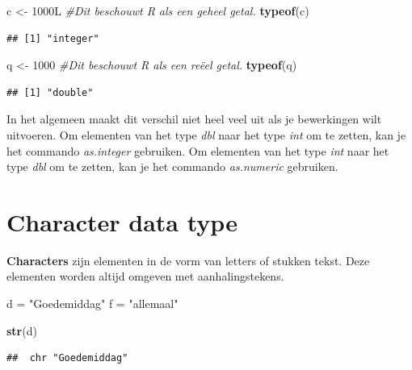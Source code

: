 \documentclass[
]{book}
\newenvironment{Shaded}{\begin{snugshade}}{\end{snugshade}}
\newcommand{\CommentTok}[1]{\textcolor[rgb]{0.56,0.35,0.01}{\textit{#1}}}
\newcommand{\DecValTok}[1]{\textcolor[rgb]{0.00,0.00,0.81}{#1}}
\newcommand{\FunctionTok}[1]{\textcolor[rgb]{0.13,0.29,0.53}{\textbf{#1}}}
\newcommand{\NormalTok}[1]{#1}
\newcommand{\OtherTok}[1]{\textcolor[rgb]{0.56,0.35,0.01}{#1}}
\newcommand{\StringTok}[1]{\textcolor[rgb]{0.31,0.60,0.02}{#1}}
\begin{document}
\begin{Shaded}
\begin{Highlighting}[]
\NormalTok{c }\OtherTok{\textless{}{-}}\NormalTok{ 1000L }\CommentTok{\#Dit beschouwt R als een geheel getal.}
\FunctionTok{typeof}\NormalTok{(c)}
\end{Highlighting}
\end{Shaded}

\begin{verbatim}
## [1] "integer"
\end{verbatim}

\begin{Shaded}
\begin{Highlighting}[]
\NormalTok{q }\OtherTok{\textless{}{-}} \DecValTok{1000} \CommentTok{\#Dit beschouwt R als een reëel getal.}
\FunctionTok{typeof}\NormalTok{(q)}
\end{Highlighting}
\end{Shaded}

\begin{verbatim}
## [1] "double"
\end{verbatim}

In het algemeen maakt dit verschil niet heel veel uit als je bewerkingen wilt uitvoeren. Om elementen van het type \emph{dbl} naar het type \emph{int} om te zetten, kan je het commando \emph{as.integer} gebruiken. Om elementen van het type \emph{int} naar het type \emph{dbl} om te zetten, kan je het commando \emph{as.numeric} gebruiken.

\hypertarget{character-data-type}{%
\section{Character data type}\label{character-data-type}}

\textbf{Characters} zijn elementen in de vorm van letters of stukken tekst. Deze elementen
worden altijd omgeven met aanhalingstekens.

\begin{Shaded}
\begin{Highlighting}[]
\NormalTok{d }\OtherTok{=} \StringTok{"Goedemiddag"}
\NormalTok{f }\OtherTok{=} \StringTok{"allemaal"}

\FunctionTok{str}\NormalTok{(d)}
\end{Highlighting}
\end{Shaded}

\begin{verbatim}
##  chr "Goedemiddag"
\end{verbatim}
\end{document}
